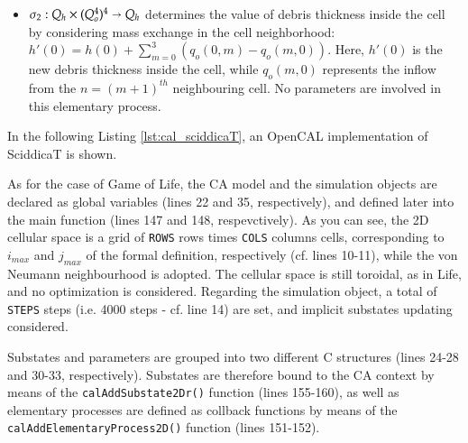 \begin{itemize}
\begin{itemize}

\item $\sigma_2: Q_h \times (Q_o^4)^4 \shortrightarrow Q_h$ determines
  the value of debris thickness inside the cell by considering mass
  exchange in the cell neighborhood: $h'(0) = h(0) + \sum_{m=0}^3
  (q_o(0,m) - q_o(m,0))$. Here, $h'(0)$ is the new debris
  thickness inside the cell, while $q_o(m,0)$ represents the inflow from
  the $n=(m+1)^{th}$ neighbouring cell. No parameters are involved in
  this elementary process.

\end{itemize}
\end{itemize}

In the following Listing \ref{lst:cal_sciddicaT}, an OpenCAL
implementation of SciddicaT is shown.



As for the case of Game of Life, the CA model and the simulation
objects are declared as global variables (lines 22 and 35,
respectively), and defined later into the main function (lines 147 and
148, respevctively). As you can see, the 2D cellular space is a grid
of \verb'ROWS' rows times \verb'COLS' columns cells, corresponding to
$i_{max}$ and $j_{max}$ of the formal definition, respectively
(cf. lines 10-11), while the von Neumann neighbourhood is adopted. The
cellular space is still toroidal, as in Life, and no optimization is
considered. Regarding the simulation object, a total of \verb'STEPS'
steps (i.e. 4000 steps - cf. line 14) are set, and implicit substates
updating considered.

Substates and parameters are grouped into two different C structures
(lines 24-28 and 30-33, respectively). Substates are therefore bound to
the CA context by means of the \verb'calAddSubstate2Dr()' function
(lines 155-160), as well as elementary processes are defined as
collback functions by means of the \verb'calAddElementaryProcess2D()'
function (lines 151-152).

